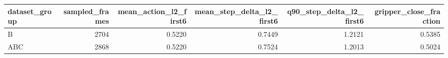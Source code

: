 \begin{tabular}{lrrrrr}
\toprule
dataset\_group & sampled\_frames & mean\_action\_l2\_first6 & mean\_step\_delta\_l2\_first6 & q90\_step\_delta\_l2\_first6 & gripper\_close\_fraction \\
\midrule
B & 2704 & 0.5220 & 0.7449 & 1.2121 & 0.5385 \\
ABC & 2868 & 0.5220 & 0.7524 & 1.2013 & 0.5024 \\
\bottomrule
\end{tabular}

